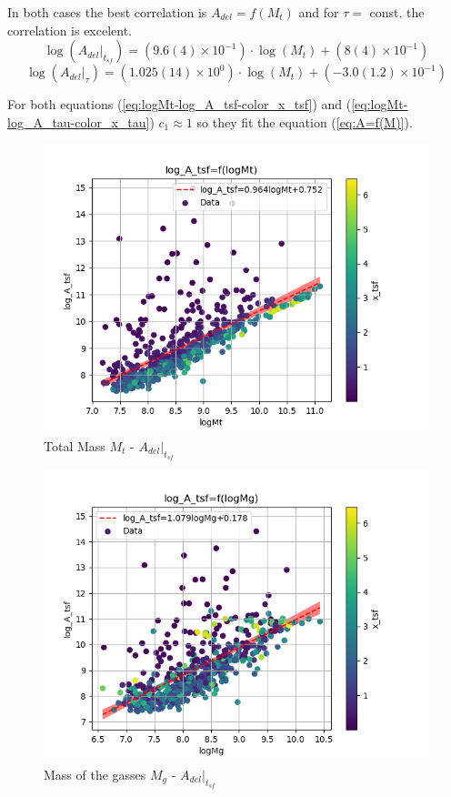 \documentclass[a4paper,twocolumn]{article}
\begin{document}
In both cases the best correlation is  \(A_{del} = f(M_t)\) and for \(\tau =\) const. the correlation is excelent.
\begin{equation}\label{eq:logMt-log_A_tsf-color_x_tsf}
\log(A_{del}|_t_{sf}) = (9.6(4) \times 10^{-1})\cdot \log(M_t) + (8(4) \times 10^{-1})
\end{equation}
\begin{equation}\label{eq:logMt-log_A_tau-color_x_tau}
\log(A_{del}|_\tau) = (1.025(14) \times 10^{0})\cdot \log(M_t) + (-3.0(1.2) \times 10^{-1})
\end{equation}

For both equations (\ref{eq:logMt-log_A_tsf-color_x_tsf}) and (\ref{eq:logMt-log_A_tau-color_x_tau}) \(c_1\approx 1\) so they fit the equation (\ref{eq:A=f(M)}).

\begin{figure}[!htpb]
\centering
\includegraphics[width=.9\linewidth]{./figs/logMt-log_A_tsf-color_x_tsf.png}
\caption{\label{fig:A_tsf_Mt}Total Mass \(M_t\) - \(A_{del}|_{t_{sf}}\)}
\end{figure}

\begin{figure}[!htpb]
\centering
\includegraphics[width=.9\linewidth]{./figs/logMg-log_A_tsf-color_x_tsf.png}
\caption{\label{fig:A_tsf_Mg}Mass of the gasses \(M_g\) - \(A_{del}|_{t_{sf}}\)}
\end{figure}
\end{document}
